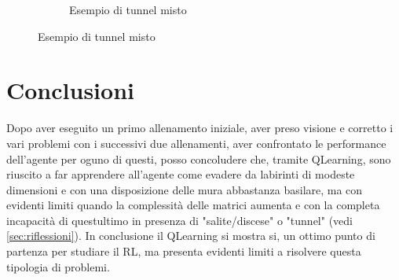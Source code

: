 \begin{figure}[H]
\begin{subfigure}{.33\textwidth}
		\caption{Esempio di tunnel misto}
	\end{subfigure}%
\end{figure}

\section{Conclusioni}

Dopo aver eseguito un primo allenamento iniziale, aver preso visione e corretto i vari problemi con i successivi due allenamenti, aver confrontato le performance dell'agente per oguno di questi, posso concoludere che, tramite QLearning, sono riuscito a far apprendere all'agente come evadere da labirinti di modeste dimensioni e con una disposizione delle mura abbastanza basilare, ma con evidenti limiti quando la complessit\`{a} delle matrici aumenta e con la completa incapacit\`{a} di questultimo in presenza di "salite/discese" o "tunnel" (vedi \autoref{sec:riflessioni}).
In conclusione il QLearning si mostra si, un ottimo punto di partenza per studiare il RL, ma presenta evidenti limiti a risolvere questa tipologia di problemi.
